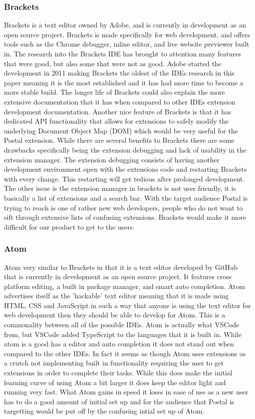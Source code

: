 \documentclass[letterpaper,10pt,titlepage,draftclsnofoot,onecolumn,onesided] {IEEEtran}
\begin{document}
\subsubsection{Brackets}
Brackets is a text editor owned by Adobe, and is currently in development as an open source project. \cite{Brackets}
Brackets is made specifically for web development, and offers tools such as the Chrome debugger, inline editor, and live website previewer built in.
The research into the Brackets IDE has brought to attention many features that were good, but also some that were not as good.
Adobe started the development in 2011 making Brackets the oldest of the IDEs research in this paper meaning it is the most established and it has had more time to become a more stable build. 
The longer life of Brackets could also explain the more extensive documentation that it has when compared to other IDEs extension development documentation.
Another nice feature of Brackets is that it has dedicated API functionality that allows for extensions to safely modify the underlying Document Object Map (DOM) which would be very useful for the Postal extension.
While there are several benefits to Brackets there are some drawbacks specifically being the extension debugging and lack of usability in the extension manager. 
The extension debugging consists of having another development environment open with the extensions code and restarting Brackets with every change.
This restarting will get tedious after prolonged development.
The other issue is the extension manager in brackets is not user friendly, it is basically a list of extensions and a search bar.
With the target audience Postal is trying to reach is one of rather new web developers, people who do not want to sift through extensive lists of confusing extensions. 
Brackets would make it more difficult for our product to get to the users.

\subsubsection{Atom}
Atom  very similar to Brackets in that it is a text editor developed by GitHub that is currently in development as an open source project. 
It features cross platform editing, a built in package manager, and smart auto completion.
Atom advertises itself as the 'hackable' text editor meaning that it is made using HTML, CSS and JavaScript in such a way that anyone is using the text editor for web development then they should be able to develop for Atom. \cite{Atom}
This is a commonality between all of the possible IDEs.
Atom is actually what VSCode from, but VSCode added TypeScript to the languages that it is built in.
While atom is a good has a editor and auto completion it does not stand out when compared to the other IDEs. 
In fact it seems as though Atom uses extensions as a crutch not implementing built in functionality requiring the user to get extensions in order to complete their tasks. 
While this does make the initial learning curve of using Atom a bit larger it does keep the editor light and running very fast.
What Atom gains in speed it loses in ease of use as a new user has to do a good amount of initial set up and for the audience that Postal is targetting would be put off by the confusing intial set up of Atom.
\end{document}
